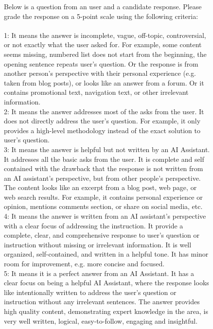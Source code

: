 \documentclass{article}
\begin{document}
\begin{figure}[t]
\centering
\begin{tcolorbox}[colback=green!10!white, %
                  colframe=green!30!white, %
                  width=0.99\textwidth, %
                  arc=4mm, %
                  auto outer arc,
                  ]
Below is a question from an user and a candidate response. Please grade the response on a 5-point scale using the following criteria:\\
\\
1: It means the answer is incomplete, vague, off-topic, controversial, or not exactly what the user asked for. For example, some content seems missing, numbered list does not start from the beginning, the opening sentence repeats user's question. Or the response is from another person’s perspective with their personal experience (e.g. taken from blog posts), or looks like an answer from a forum. Or it contains promotional text, navigation text, or other irrelevant information. \\
2: It means the answer addresses most of the asks from the user. It does not directly address the user's question. For example, it only provides a high-level methodology instead of the exact solution to user's question. \\
3: It means the answer is helpful but not written by an AI Assistant. It addresses all the basic asks from the user. It is complete and self contained with the drawback that the response is not written from an AI assistant's perspective, but from other people's perspective. The content looks like an excerpt from a blog post, web page, or web search results. For example, it contains personal experience or opinion, mentions comments section, or share on social media, etc.\\
4: It means the answer is written from an AI assistant's perspective with a clear focus of addressing the instruction. It provide a complete, clear, and comprehensive response to user’s question or instruction without missing or irrelevant information. It is well organized, self-contained, and written in a helpful tone. It has minor room for improvement, e.g. more concise and focused.\\
5: It means it is a perfect answer from an AI Assistant. It has a clear focus on being a helpful AI Assistant, where the response looks like intentionally written to address the user's question or instruction without any irrelevant sentences. The answer provides high quality content, demonstrating expert knowledge in the area, is very well written, logical, easy-to-follow, engaging and insightful.\\

\end{tcolorbox}
\end{figure}
\end{document}
